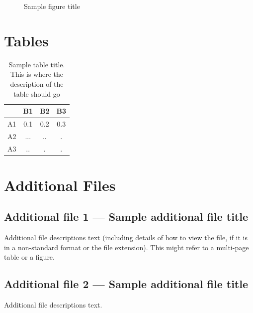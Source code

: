 \documentclass{bmcart}
\begin{document}
\begin{backmatter}
\begin{figure}[h!]
  \caption{Sample figure title}
\end{figure}


\section*{Tables}
\begin{table}[h!]
\caption{Sample table title. This is where the description of the table should go}
  \begin{tabular}{cccc}
    \hline
    & B1  &B2   & B3\\ \hline
    A1 & 0.1 & 0.2 & 0.3\\
    A2 & ... & ..  & .\\
    A3 & ..  & .   & .\\ \hline
  \end{tabular}
\end{table}


\section*{Additional Files}
  \subsection*{Additional file 1 --- Sample additional file title}
    Additional file descriptions text (including details of how to
    view the file, if it is in a non-standard format or the file extension).  This might
    refer to a multi-page table or a figure.

  \subsection*{Additional file 2 --- Sample additional file title}
    Additional file descriptions text.

\end{backmatter}
\end{document}
